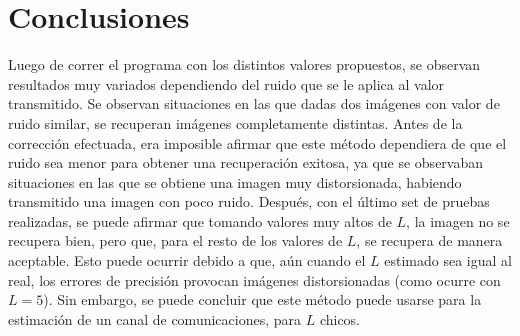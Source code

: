 \documentclass[10pt,journal,compsoc]{IEEEtran}
\begin{document}
\section{Conclusiones}

Luego de correr el programa con los distintos valores propuestos, se observan resultados muy variados dependiendo del ruido que se le aplica al valor transmitido. Se observan situaciones en las que dadas dos im\'agenes con valor de ruido similar, se recuperan im\'agenes completamente distintas. Antes de la correcci\'on efectuada, era imposible afirmar que este m\'etodo dependiera de que el ruido sea menor para obtener una recuperaci\'on exitosa, ya que se observaban situaciones en las que se obtiene una imagen muy distorsionada, habiendo transmitido una imagen con poco ruido. Despu\'es, con el \'ultimo set de pruebas realizadas, se puede afirmar que tomando valores muy altos de $L$, la imagen no se recupera bien, pero que, para el resto de los valores de $L$, se recupera de manera aceptable. Esto puede ocurrir debido a que, a\'un cuando el $L$ estimado sea igual al real, los errores de precisi\'on provocan im\'agenes distorsionadas (como ocurre con $L=5$).  Sin embargo, se puede concluir que este m\'etodo puede usarse para la estimaci\'on de un canal de comunicaciones, para $L$ chicos. \\


%
\end{document}
